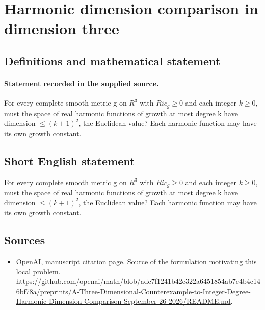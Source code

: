 \documentclass[11pt]{article}
\begin{document}
\section*{Harmonic dimension comparison in dimension three}\label{30007146}
\subsection{Definitions and mathematical statement}
\paragraph{Statement recorded in the supplied source.}
For every complete smooth metric g on $R^{3}$ with $Ric_g\geq 0$ and each integer $k\geq 0$, must the space of real harmonic functions of growth at most degree k have dimension $\leq (k+1)^{2}$, the Euclidean value? Each harmonic function may have its own growth constant.
\subsection{Short English statement}
For every complete smooth metric g on $R^{3}$ with $Ric_g\geq 0$ and each integer $k\geq 0$, must the space of real harmonic functions of growth at most degree k have dimension $\leq (k+1)^{2}$, the Euclidean value? Each harmonic function may have its own growth constant.
\subsection{Sources}
\begin{itemize}
\item[S1] OpenAI, manuscript citation page. Source of the formulation motivating this local problem.
\url{https://github.com/openai/math/blob/adc7f1241b42e322a6451854ab7e4b4c146bf78a/preprints/A-Three-Dimensional-Counterexample-to-Integer-Degree-Harmonic-Dimension-Comparison-September-26-2026/README.md}.
\end{itemize}
\end{document}
